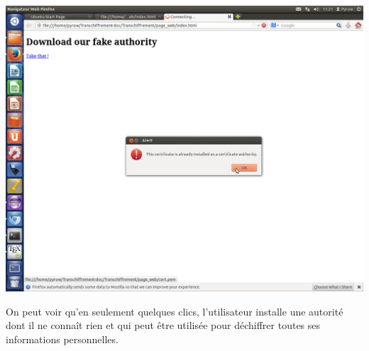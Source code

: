 \documentclass[a4paper,11pt,french]{article}
\begin{document}
\includegraphics[width=\textwidth]{images/Alerte.png}

On peut voir qu'en seulement quelques clics, l'utilisateur installe une autorité dont il ne connaît rien et qui peut être utilisée pour déchiffrer toutes ses informations personnelles. 
\newpage
\end{document}
